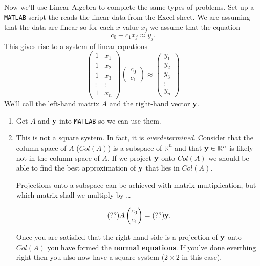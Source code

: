 \begin{problem}
    Now we'll use Linear Algebra to complete the same types of problems.  Set up a
    \texttt{MATLAB} script the reads the linear data from the Excel sheet.  We are
    assuming that the data are linear so for each $x$-value $x_j$ we assume that the equation 
    \[ c_0 + c_1 x_j \approx y_j. \]
    This gives rise to a system of linear equations
    \[ \begin{pmatrix} 1 & x_1 \\ 1 & x_2 \\ 1 & x_3 \\ \vdots & \vdots \\ 1 & x_n
        \end{pmatrix} \begin{pmatrix} c_0 \\ c_1 \end{pmatrix} \approx \begin{pmatrix} y_1
            \\ y_2 \\ y_3 \\ \vdots \\ y_n \end{pmatrix} \]
    We'll call the left-hand matrix $A$ and the right-hand vector ${\bf y}$.  
    \begin{enumerate}
        \item Get $A$ and ${\bf y}$ into \texttt{MATLAB} so we can use them.
        \item This is not a square system. In fact, it is {\it overdetermined}.  Consider
            that the column space of $A$ ($Col(A)$) is a subspace of $\mathbb{R}^n$ and
            that ${\bf y} \in \mathbb{R}^n$ is likely not in the column space of $A$.  If we
            project ${\bf y}$ onto $Col(A)$ we should be able to find the best approximation
            of ${\bf y}$ that lies in $Col(A)$. 

            Projections onto a subspace can be achieved with matrix multiplication, but
            which matrix shall we multiply by \dots

            \[ (??) A \begin{pmatrix} c_0 \\ c_1 \end{pmatrix}  = (??) {\bf y}. \]

            Once you are satisfied that the right-hand side is a projection of ${\bf y}$ onto
            $Col(A)$ you have formed the {\bf normal equations}.  If you've done everthing
            right then you also now have a square system ($2 \times 2$ in this case).


\end{enumerate}
\end{problem}

